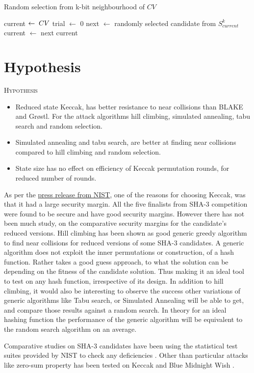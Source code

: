 \begin{algorithm}[h]
  \caption{ Random selection from k-bit neighbourhood of $CV$ }
  \begin{algorithmic}[1]
      \State current $\gets \thickspace CV$
      \State trial $\gets$ 0
        \State next $\gets$ randomly selected candidate from $S^{k}_{current}$
          \State current $\gets$ next
        \EndIf
      \EndWhile 
      \State \Return current
    \EndFunction
  \end{algorithmic}
\end{algorithm}

\section{Hypothesis}

\begin{center}
  \framebox
  {
    \parbox{400pt}
    {
      \centering \textsc{Hypothesis} \\
      \begin{itemize}
      \item Reduced state Keccak, has better resistance to near collisions than BLAKE and Gr{\o}stl. For the
      attack algorithms hill climbing, simulated annealing, tabu search and random selection.
      \item Simulated annealing and tabu search, are better at finding near collisions compared to hill 
      climbing and random selection.
      \item State size has no effect on efficiency of Keccak permutation rounds, for reduced number of rounds.
      \end{itemize}
    }
  }
\end{center}

As per the \href{"http://csrc.nist.gov/groups/ST/hash/sha-3/sha-3\_selection\_announcement.pdf"}{press release from NIST}, 
one of the reasons for choosing Keccak, was that it had a large security margin. All the five finalists from SHA-3 competition
were found to be secure and have good security margins. However there has not been much study, on the comparative security
margins for the candidate's reduced versions. Hill climbing has been shown as good generic greedy algorithm to find 
near collisions for reduced versions of some SHA-3 candidates. A generic algorithm does not exploit the inner permutations
or construction, of a hash function. Rather takes a good guess approach, to what the solution can be depending on the fitness
of the candidate solution. Thus making it an ideal tool to test on any hash function, irrespective of its design. In addition
to hill climbing, it would also be interesting to observe the success other variations of generic algorithms like Tabu search,
or Simulated Annealing will be able to get, and compare those results against a random search. In theory for an ideal hashing
function the performance of the generic algorithm will be equivalent to the random search algorithm on an average.

Comparative studies on SHA-3 candidates have been using the statistical test suites provided by NIST to check any 
deficiencies \cite{00030} \cite{00032}. Other than particular attacks like zero-sum property has been tested on 
Keccak and Blue Midnight Wish \cite{00031}.

